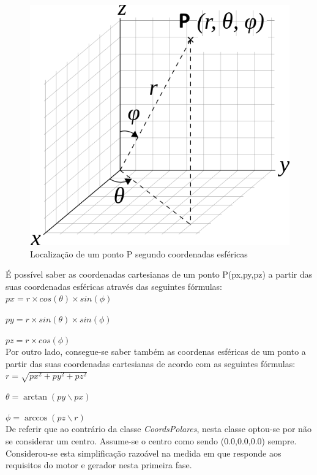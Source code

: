 \begin{figure}[<+htpb+>]
	\centering
	\includegraphics[scale=0.5]{imagens/p1_sphericalCoords.png}
	\caption{Localização de um ponto P segundo coordenadas esféricas}
	\label{p1:fig:p1_sphericalCoords}
\end{figure}

É possível saber as coordenadas cartesianas de um ponto P(px,py,pz) a partir das suas coordenadas esféricas através das seguintes fórmulas:\\

		$px = r \times cos(\theta) \times sin(\phi)$
		
		$py = r \times sin(\theta) \times sin(\phi) $
		
		$pz = r \times cos(\phi)$\\


Por outro lado, consegue-se saber também as coordenas esféricas de um ponto a partir das suas coordenadas cartesianas de acordo com as seguintes fórmulas:\\

		$r = \sqrt{px^2 + py^2 + pz^2}$
		
		$\theta = \arctan(py \backslash px) $
		
		$\phi = \arccos (pz \backslash r)$\\

De referir que ao contrário da classe \textit{CoordsPolares}, nesta classe optou-se por não se considerar um centro. Assume-se o centro como sendo (0.0,0.0,0.0) sempre. Considerou-se esta simplificação razoável na medida em que responde aos requisitos do motor e gerador nesta primeira fase.

